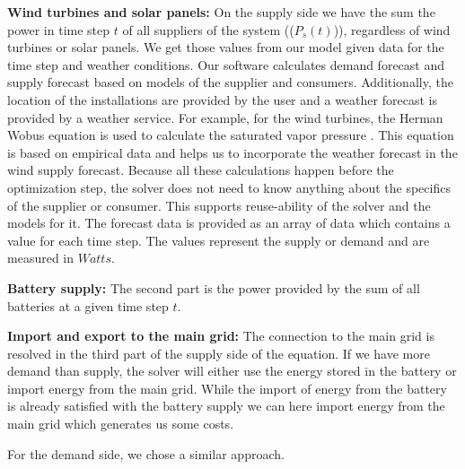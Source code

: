 \textbf{Wind turbines and solar panels:} On the supply side we have the sum the power in time step $t$ of all suppliers of the system (($P_{s}(t)$)), regardless of wind turbines or solar panels.
We get those values from our model given data for the time step and weather conditions. 
Our software calculates demand forecast and supply forecast based on models of the supplier and consumers. 
Additionally, the location of the installations are provided by the user and a weather forecast is provided by a weather service. 
For example, for the wind turbines, the Herman Wobus equation is used to calculate the saturated vapor pressure \cite{NOAA}. 
This equation is based on empirical data and helps us to incorporate the weather forecast in the wind supply forecast. 
Because all these calculations happen before the optimization step, the solver does not need to know anything about the specifics of the supplier or consumer. 
This supports reuse-ability of the solver and the models for it. 
The forecast data is provided as an array of data which contains a value for each time step. 
The values represent the supply or demand and are measured in $Watts$.  %

\textbf{Battery supply:} The second part is the power provided by the sum of all batteries at a given time step $t$. %

\textbf{Import and export to the main grid:} The connection to the main grid is resolved in the third part of the supply side of the equation.
If we have more demand than supply, the solver will either use the energy stored in the battery or import energy from the main grid.
While the import of energy from the battery is already satisfied with the battery supply we can here import energy from the main grid which generates us some costs.

For the demand side, we chose a similar approach.

